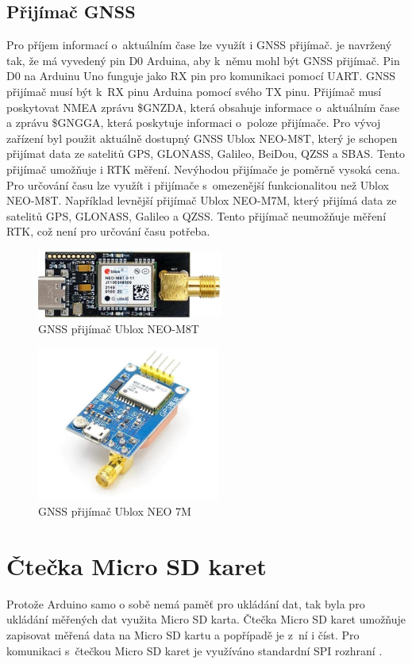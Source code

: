 \subsection{Přijímač GNSS}
Pro příjem informací o~aktuálním čase lze využít i GNSS přijímač.  je navržený tak, že má vyvedený pin D0 Arduina, aby k~němu mohl být   GNSS přijímač. Pin D0 na Arduinu Uno funguje jako RX pin pro  komunikaci pomocí UART. GNSS přijímač musí být k~RX pinu Arduina  pomocí svého TX pinu. Přijímač musí poskytovat NMEA zprávu \$GNZDA, která obsahuje informace o~aktuálním čase a zprávu \$GNGGA, která poskytuje informaci o~poloze přijímače. Pro vývoj zařízení byl použit aktuálně dostupný GNSS  Ublox NEO-M8T, který je schopen přijímat data ze satelitů GPS, GLONASS, Galileo, BeiDou, QZSS a SBAS. Tento přijímač umožňuje i RTK měření. Nevýhodou přijímače je poměrně vysoká cena. Pro určování času lze využít i přijímače s~omeze\-nější funkcionalitou než Ublox NEO-M8T. Například levnější přijímač Ublox NEO-M7M, který přijímá data ze satelitů GPS, GLONASS, Galileo a QZSS. Tento přijímač neumožňuje měření RTK, což není pro určování času potřeba.
\begin{figure}[H]
\centering
\includegraphics[width=6.1cm]{images/komponenty/GNSS_UBLOX.png}
\caption{GNSS přijímač Ublox NEO-M8T \cite{gnss_store}}
\end{figure}

\begin{figure}[H]
	\centering
	\includegraphics[width=6cm]{images/komponenty/UBLOX_NEO_7M.jpg}
	\caption{GNSS přijímač Ublox NEO 7M \cite{dratek_web}}
\end{figure}

\section{Čtečka Micro SD karet}
Protože Arduino samo o sobě nemá paměť pro ukládání dat, tak byla pro ukládání měřených dat využita Micro SD karta. Čtečka Micro SD karet umožňuje zapisovat měřená data na Micro SD kartu a popřípadě je z~ní i číst. Pro komunikaci s~čtečkou Micro SD karet je využíváno standardní SPI rozhraní \cite{arduino_navody}.

